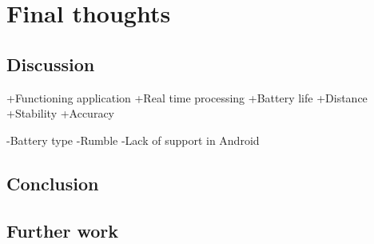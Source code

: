 \chapter{Final thoughts}

\section{Discussion}
+Functioning application
+Real time processing
+Battery life
+Distance
+Stability
+Accuracy

-Battery type
-Rumble
-Lack of support in Android
\section{Conclusion}


\section{Further work}